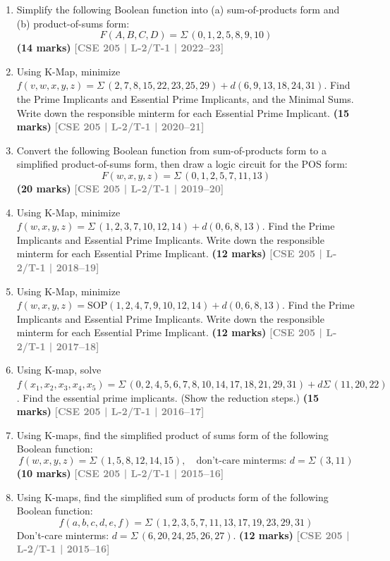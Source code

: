 \documentclass[12pt]{article}
\newcommand{\yr}[1]{\hfill\textcolor{gray}{\small\textbf{[#1]}}}
\newcommand{\mk}[1]{\textcolor{orange!70!black}{\small\textbf{(#1 marks)}}}
\begin{document}
\begin{enumerate}

\item Simplify the following Boolean function into (a) sum-of-products form and (b) product-of-sums form:
\[ F(A, B, C, D) = \Sigma\,(0, 1, 2, 5, 8, 9, 10) \]
\mk{14} \yr{CSE 205 | L-2/T-1 | 2022--23}

\item Using K-Map, minimize $f(v,w,x,y,z) = \Sigma\,(2,7,8,15,22,23,25,29) + d(6,9,13,18,24,31)$. Find the Prime Implicants and Essential Prime Implicants, and the Minimal Sums. Write down the responsible minterm for each Essential Prime Implicant.
\mk{15} \yr{CSE 205 | L-2/T-1 | 2020--21}

\item Convert the following Boolean function from sum-of-products form to a simplified product-of-sums form, then draw a logic circuit for the POS form:
\[ F(w,x,y,z) = \Sigma\,(0,1,2,5,7,11,13) \]
\mk{20} \yr{CSE 205 | L-2/T-1 | 2019--20}

\item Using K-Map, minimize $f(w,x,y,z) = \Sigma\,(1,2,3,7,10,12,14) + d(0,6,8,13)$. Find the Prime Implicants and Essential Prime Implicants. Write down the responsible minterm for each Essential Prime Implicant.
\mk{12} \yr{CSE 205 | L-2/T-1 | 2018--19}

\item Using K-Map, minimize $f(w,x,y,z) = \mathrm{SOP}(1,2,4,7,9,10,12,14) + d(0,6,8,13)$. Find the Prime Implicants and Essential Prime Implicants. Write down the responsible minterm for each Essential Prime Implicant.
\mk{12} \yr{CSE 205 | L-2/T-1 | 2017--18}

\item Using K-map, solve $f(x_1,x_2,x_3,x_4,x_5) = \Sigma\,(0,2,4,5,6,7,8,10,14,17,18,21,29,31) + d\Sigma\,(11,20,22)$. Find the essential prime implicants. (Show the reduction steps.)
\mk{15} \yr{CSE 205 | L-2/T-1 | 2016--17}

\item Using K-maps, find the simplified product of sums form of the following Boolean function:
\[ f(w, x, y, z) = \Sigma\,(1, 5, 8, 12, 14, 15), \quad \text{don't-care minterms: } d = \Sigma\,(3, 11) \]
\mk{10} \yr{CSE 205 | L-2/T-1 | 2015--16}

\item Using K-maps, find the simplified sum of products form of the following Boolean function:
\[ f(a,b,c,d,e,f) = \Sigma\,(1,2,3,5,7,11,13,17,19,23,29,31) \]
Don't-care minterms: $d = \Sigma\,(6,20,24,25,26,27)$.
\mk{12} \yr{CSE 205 | L-2/T-1 | 2015--16}


\end{enumerate}
\end{document}
